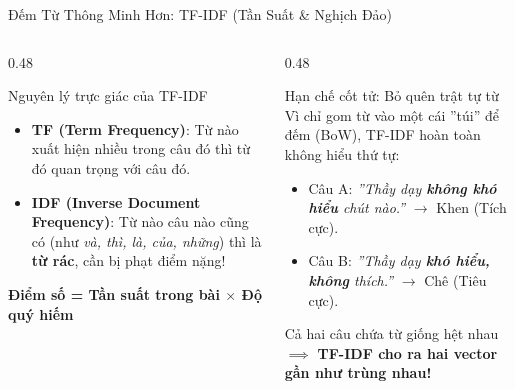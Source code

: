 \documentclass[aspectratio=169, 10pt]{beamer}
\begin{document}
\begin{frame}{Đếm Từ Thông Minh Hơn: TF-IDF (Tần Suất \& Nghịch Đảo)}
  \begin{columns}[T, onlytextwidth]
    \begin{column}{0.48\textwidth}
      \begin{block}{Nguyên lý trực giác của TF-IDF}
        \fontsize{8}{10.5}\selectfont
        \begin{itemize}\setlength{\itemsep}{0.25em}
          \item \textbf{TF (Term Frequency)}: Từ nào xuất hiện nhiều trong câu đó thì từ đó quan trọng với câu đó.
          \item \textbf{IDF (Inverse Document Frequency)}: Từ nào câu nào cũng có (như \textit{và, thì, là, của, những}) thì là \textbf{từ rác}, cần bị phạt điểm nặng!
        \end{itemize}
        \vspace{0.15cm}
        \centering
        \color{HCMUEDarkBlue}\textbf{Điểm số = Tần suất trong bài $\times$ Độ quý hiếm}
      \end{block}
    \end{column}
    \hfill
    \begin{column}{0.48\textwidth}
      \begin{alertblock}{Hạn chế cốt tử: Bỏ quên trật tự từ}
        \fontsize{8}{10.5}\selectfont
        Vì chỉ gom từ vào một cái ''túi'' để đếm (BoW), TF-IDF hoàn toàn không hiểu thứ tự:
        \begin{itemize}\setlength{\itemsep}{0.2em}
          \item Câu A: \textit{''Thầy dạy \textbf{không khó hiểu} chút nào.''} $\to$ Khen (Tích cực).
          \item Câu B: \textit{''Thầy dạy \textbf{khó hiểu, không} thích.''} $\to$ Chê (Tiêu cực).
        \end{itemize}
        Cả hai câu chứa từ giống hệt nhau $\implies$ \textbf{TF-IDF cho ra hai vector gần như trùng nhau!}
      \end{alertblock}
    \end{column}
  \end{columns}
\end{frame}
\end{document}
